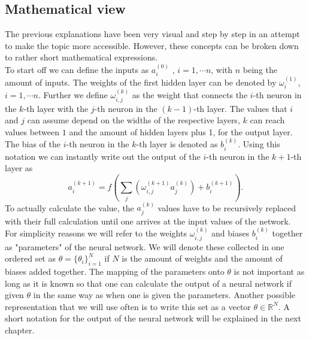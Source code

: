 \subsection{Mathematical view}
The previous explanations have been very visual and step by step in an attempt to make the topic more accessible. However, these concepts can be broken down to rather short mathematical expressions.\\
To start off we can define the inputs as $a_i^{(0)}$ , $i =  1, \dotsb n$, with $n$ being the amount of inputs. The weights of the first hidden layer can be denoted by $\omega_{i}^{(1)}$, $i =  1, \dotsb n$. Further we define $\omega_{i,j}^{(k)}$ as the weight that connects the $i$-th neuron in the $k$-th layer with the $j$-th neuron in the $(k-1)$-th layer. The values that $i$ and $j$ can assume depend on the widths of the respective layers, $k$ can reach values between $1$ and the amount of hidden layers plus 1, for the output layer. The bias of the $i$-th neuron in the $k$-th layer is denoted as $b_i^{(k)}$. Using this notation we can instantly write out the output of the $i$-th neuron in the $k+1$-th layer as
\begin{equation}
	a_i^{(k+1)} = f\left(\sum_j \left(\omega_{i,j}^{(k+1)}a_j^{(k)}\right) + b_i^{(k+1)}\right).
\end{equation}
To actually calculate the value, the $a_j^{(k)}$ values have to be recursively replaced with their full calculation until one arrives at the input values of the network.\\
For simplicity reasons we will refer to the weights $\omega_{i,j}^{(k)}$ and biases $b_i^{(k)}$ together as "parameters" of the neural network. We will denote these collected in one ordered set as $\theta = \{\theta_i\}_{i=1}^{N}$ if $N$ is the amount of weights and the amount of biases added together. The mapping of the parameters onto $\theta$ is not important as long as it is known so that one can calculate the output of a neural network if given $\theta$ in the same way as when one is given the parameters. Another possible representation that we will use often is to write this set as a vector $\theta \in \mathbb{R}^N$. A short notation for the output of the neural network will be explained in the next chapter.
